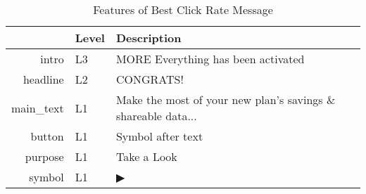 \begin{table}[ht]
\centering
\caption{Features of Best Click Rate Message} 
\label{tab:best_click}
\begin{tabular}{rll}
  \hline
 & Level & Description \\ 
  \hline
intro & L3 & MORE Everything has been activated \\ 
  headline & L2 & CONGRATS! \\ 
  main\_text & L1 & Make the most of your new plan’s savings \& shareable data... \\ 
  button & L1 & Symbol after text \\ 
  purpose & L1 & Take a Look \\ 
  symbol & L1 & ▶ \\ 
   \hline
\end{tabular}
\end{table}
